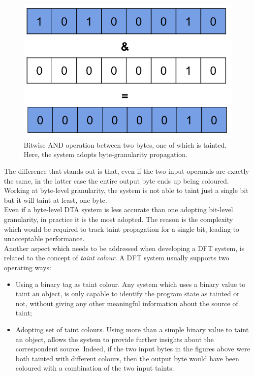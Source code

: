 \documentclass[LaM,binding=0.6cm]{sapthesis}
\begin{document}
\begin{figure}[h!]
\centering
\includegraphics[scale=.5]{images/techn3}
\caption{Bitwise AND operation between two bytes, one of which is tainted. Here, the system adopts byte-granularity propagation.}
\end{figure}
\newpage
The difference that stands out is that, even if the two input operands are exactly the same, in the latter case the entire output byte ends up being coloured. Working at byte-level granularity, the system is not able to taint just a single bit but it will taint at least, one byte.\\
Even if a byte-level DTA system is less accurate than one adopting bit-level granularity, in practice it is the most adopted. The reason is the complexity which would be required to track taint propagation for a single bit, leading to unacceptable performance.\\

Another aspect which needs to be addressed when developing a DFT system, is related to the concept of \textit{taint colour}. A DFT system usually supports two operating ways:
\begin{itemize}
\item Using a binary tag as taint colour. Any system which uses a binary value to taint an object, is only capable to identify the program state as tainted or not, without giving any other meaningful information about the source of taint; 
\item Adopting set of taint colours. Using more than a simple binary value to taint an object, allows the system to provide further insights about the correspondent source. Indeed, if the two input bytes in the figures above were both tainted with different colours, then the output byte would have been coloured with a combination of the two input taints.
\end{itemize}
\end{document}
